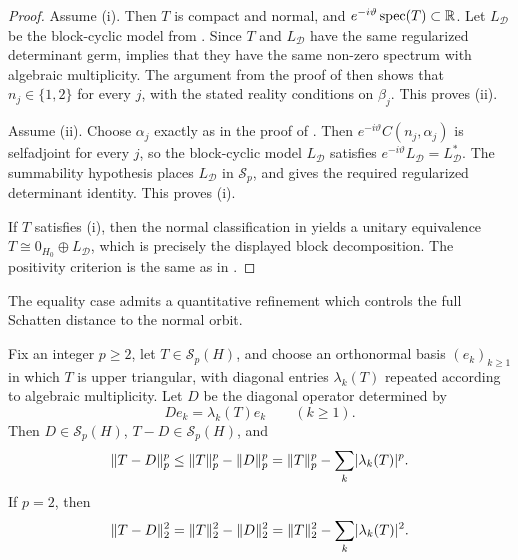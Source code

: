 \begin{proof}
  Assume \textup{(i)}. Then \(T\) is compact and normal, and
  \(e^{-i\vartheta}\operatorname{spec}(T)\subset\mathbb{R}\). Let \(L_{\mathcal D}\) be the
  block-cyclic model from . Since
  \(T\) and \(L_{\mathcal D}\) have the same regularized determinant
  germ,  implies that they have the same
  non-zero spectrum with algebraic multiplicity. The argument from the
  proof of  then shows that \(n_j\in\{1,2\}\)
  for every \(j\), with the stated reality conditions on \(\beta_j\).
  This proves \textup{(ii)}.

  Assume \textup{(ii)}. Choose \(\alpha_j\) exactly as in the proof of
  . Then \(e^{-i\vartheta}C(n_j,\alpha_j)\)
  is selfadjoint for every \(j\), so the block-cyclic model
  \(L_{\mathcal D}\) satisfies
  \(
    e^{-i\vartheta}L_{\mathcal D}=L_{\mathcal D}^*
  \).
  The summability hypothesis places \(L_{\mathcal D}\) in
  \(\mathcal S_p\), and  gives the
  required regularized determinant identity. This proves \textup{(i)}.

  If \(T\) satisfies \textup{(i)}, then the normal classification in
   yields a unitary equivalence
  \(T\cong 0_{H_0}\oplus L_{\mathcal D}\), which is precisely the
  displayed block decomposition. The positivity criterion is the same as
  in .
\end{proof}

The equality case admits a quantitative refinement which controls the
full Schatten distance to the normal orbit.

\begin{theorem}
  \label{thm:schatten-quantitative-stability}
  Fix an integer \(p\ge 2\), let \(T\in \mathcal S_p(H)\), and choose
  an orthonormal basis \((e_k)_{k\ge 1}\) in which \(T\) is upper
  triangular, with diagonal entries \(\lambda_k(T)\) repeated according
  to algebraic multiplicity. Let \(D\) be the diagonal operator
  determined by
  \[
    De_k=\lambda_k(T)e_k
    \qquad (k\ge 1).
  \]
  Then \(D\in \mathcal S_p(H)\), \(T-D\in \mathcal S_p(H)\), and
  \[
    \|T-D\|_p^p
    \le \|T\|_p^p-\|D\|_p^p
    =\|T\|_p^p-\sum_k\lvert \lambda_k(T) \rvert^p.
  \]
  If \(p=2\), then
  \[
    \|T-D\|_2^2
    =\|T\|_2^2-\|D\|_2^2
    =\|T\|_2^2-\sum_k\lvert \lambda_k(T) \rvert^2.
  \]
\end{theorem}

